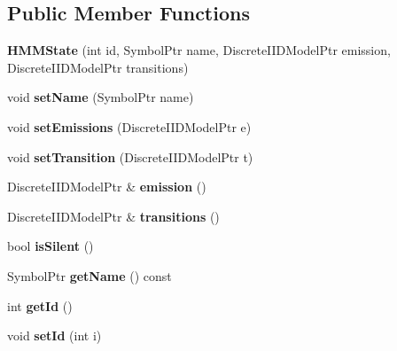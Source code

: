 \subsection*{Public Member Functions}
\begin{DoxyCompactItemize}
\item 
\mbox{\label{classtops_1_1HMMState_ab42d2aeac285900f0cb572bc8f67ba24}} 
{\bfseries H\+M\+M\+State} (int id, Symbol\+Ptr name, Discrete\+I\+I\+D\+Model\+Ptr emission, Discrete\+I\+I\+D\+Model\+Ptr transitions)
\item 
\mbox{\label{classtops_1_1HMMState_adf502dda394de2fcc0595b87a2cf5eed}} 
void {\bfseries set\+Name} (Symbol\+Ptr name)
\item 
\mbox{\label{classtops_1_1HMMState_a4217dc4c1a7ba103652a3fe2c0fd923c}} 
void {\bfseries set\+Emissions} (Discrete\+I\+I\+D\+Model\+Ptr e)
\item 
\mbox{\label{classtops_1_1HMMState_a7530f97cec1f32c1f9f992b1081b8df5}} 
void {\bfseries set\+Transition} (Discrete\+I\+I\+D\+Model\+Ptr t)
\item 
\mbox{\label{classtops_1_1HMMState_a0d4d649258df3279459f4093cc5ca5ae}} 
Discrete\+I\+I\+D\+Model\+Ptr \& {\bfseries emission} ()
\item 
\mbox{\label{classtops_1_1HMMState_af78e97bb68c15bf2dc353506878ac3b6}} 
Discrete\+I\+I\+D\+Model\+Ptr \& {\bfseries transitions} ()
\item 
\mbox{\label{classtops_1_1HMMState_a0412b89099d2806445e293c07c235693}} 
bool {\bfseries is\+Silent} ()
\item 
\mbox{\label{classtops_1_1HMMState_af613b64255fbabe447c32498dc3fd607}} 
Symbol\+Ptr {\bfseries get\+Name} () const
\item 
\mbox{\label{classtops_1_1HMMState_ac650aee0a4fd610684a21dab14b58452}} 
int {\bfseries get\+Id} ()
\item 
\mbox{\label{classtops_1_1HMMState_a30e57645daa4af0012059d65612aeff2}} 
void {\bfseries set\+Id} (int i)
\end{DoxyCompactItemize}
